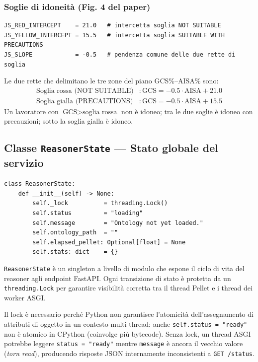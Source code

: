 \documentclass[a4paper,12pt]{article}
\begin{document}
\subsubsection{Soglie di idoneit\`{a} (Fig. 4 del paper)}

\begin{lstlisting}[caption={Costanti per la classificazione di idoneit\`{a}.}]
JS_RED_INTERCEPT    = 21.0   # intercetta soglia NOT SUITABLE
JS_YELLOW_INTERCEPT = 15.5   # intercetta soglia SUITABLE WITH PRECAUTIONS
JS_SLOPE            = -0.5   # pendenza comune delle due rette di soglia
\end{lstlisting}

\noindent Le due rette che delimitano le tre zone del piano GCS\%--AISA\% sono:
\begin{align}
  \text{Soglia rossa (NOT SUITABLE)}   &: \text{GCS} = -0.5 \cdot \text{AISA} + 21.0 \\
  \text{Soglia gialla (PRECAUTIONS)}   &: \text{GCS} = -0.5 \cdot \text{AISA} + 15.5
\end{align}
Un lavoratore con $\text{GCS} > \text{soglia rossa}$ non \`{e} idoneo;
tra le due soglie \`{e} idoneo con precauzioni; sotto la soglia gialla \`{e}
idoneo.

\subsection{Classe \texttt{ReasonerState} --- Stato globale del servizio}

\begin{lstlisting}[caption={Classe \texttt{ReasonerState} --- singleton thread-safe.}]
class ReasonerState:
    def __init__(self) -> None:
        self._lock          = threading.Lock()
        self.status         = "loading"
        self.message        = "Ontology not yet loaded."
        self.ontology_path  = ""
        self.elapsed_pellet: Optional[float] = None
        self.stats: dict    = {}
\end{lstlisting}

\noindent \texttt{ReasonerState} \`{e} un singleton a livello di modulo che espone
il ciclo di vita del reasoner agli endpoint FastAPI. Ogni transizione
di stato \`{e} protetta da un \texttt{threading.Lock} per garantire
visibilit\`{a} corretta tra il thread Pellet e i thread dei worker ASGI.

Il lock \`{e} necessario perch\'{e} Python non garantisce l'atomicit\`{a}
dell'assegnamento di attributi di oggetto in un contesto multi-thread:
anche \texttt{self.status = "ready"} non \`{e} atomico in CPython
(coinvolge pi\`{u} bytecode). Senza lock, un thread ASGI potrebbe
leggere \texttt{status = "ready"} mentre \texttt{message} \`{e} ancora
il vecchio valore (\textit{torn read}), producendo risposte JSON
internamente inconsistenti a \texttt{GET /status}.
\end{document}
